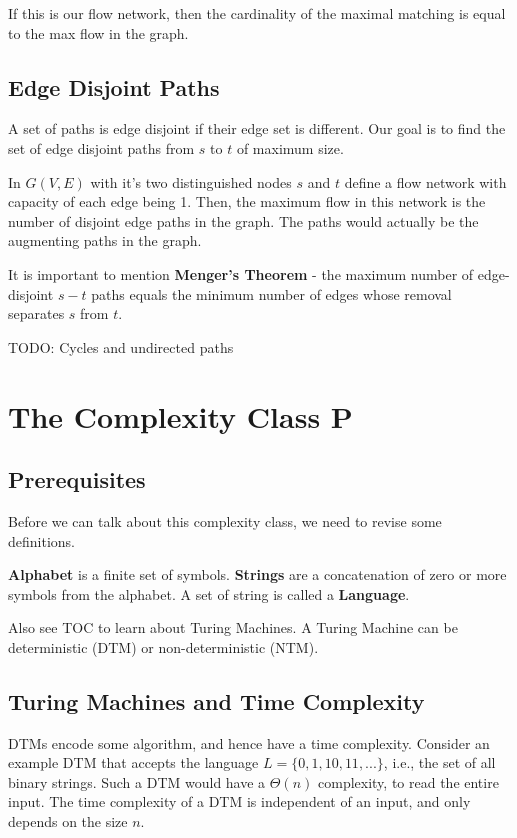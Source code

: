\documentclass[12pt,letterpaper]{article}
\theoremstyle{definition}
\begin{document}
If this is our flow network, then the cardinality of the maximal matching is equal to the max flow in the graph.

\subsection{Edge Disjoint Paths}

A set of paths is edge disjoint if their edge set is different. Our goal is to find the set of edge disjoint paths from $s$ to $t$ of maximum size.

In $G(V,E)$ with it's two distinguished nodes $s$ and $t$ define a flow network with capacity of each edge being 1. Then, the maximum flow in this network is the number of disjoint edge paths in the graph. The paths would actually be the augmenting paths in the graph.

It is important to mention \textbf{Menger's Theorem} - the maximum number of edge-disjoint $s-t$ paths equals the minimum number of edges whose removal separates $s$ from $t$.

TODO: Cycles and undirected paths

\section{The Complexity Class P}

\subsection{Prerequisites}

Before we can talk about this complexity class, we need to revise some definitions.

\textbf{Alphabet} is a finite set of symbols. \textbf{Strings} are a concatenation of zero or more symbols from the alphabet. A set of string is called a \textbf{Language}.

Also see TOC to learn about Turing Machines. A Turing Machine can be deterministic (DTM) or non-deterministic (NTM).

\subsection{Turing Machines and Time Complexity}

DTMs encode some algorithm, and hence have a time complexity. Consider an example DTM that accepts the language $L = \{0,1,10,11,...\}$, i.e., the set of all binary strings. Such a DTM would have a $\Theta(n)$ complexity, to read the entire input. The time complexity of a DTM is independent of an input, and only depends on the size $n$.
\end{document}
